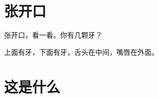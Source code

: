\documentclass[12pt,UTF-8,openany]{ctexbook}
\begin{document}
\hanzibox{}\hanzibox{}\hanzibox{}\hanzibox{}\hspace{1em}\hanzibox{}\hanzibox{}\hanzibox{}\hanzibox{}

\hanzibox{}\hanzibox{}\hanzibox{}\hanzibox{}\hspace{1em}\hanzibox{}\hanzibox{}\hanzibox{}\hanzibox{}

\hanzibox{}\hanzibox{}\hanzibox{}\hanzibox{}\hspace{1em}\hanzibox{}\hanzibox{}\hanzibox{}\hanzibox{}

\hanzibox{}\hanzibox{}\hanzibox{}\hanzibox{}\hspace{1em}\hanzibox{}\hanzibox{}\hanzibox{}\hanzibox{}

\hanzibox{}\hanzibox{}\hanzibox{}\hanzibox{}\hspace{1em}




\chapter{张开口}

\begin{large}
    
    张开口，看一看。你有几颗牙？
    
    上面有牙，下面有牙，舌头在中间，嘴唇在外面。
    
\end{large}


\clearpage

\begin{center}
    
\end{center}


\hanzibox{}\hanzibox{}\hanzibox{}\hanzibox{}\hspace{1em}\hanzibox{}\hanzibox{}\hanzibox{}\hanzibox{}

\hanzibox{}\hanzibox{}\hanzibox{}\hanzibox{}\hspace{1em}\hanzibox{}\hanzibox{}\hanzibox{}\hanzibox{}

\hanzibox{}\hanzibox{}\hanzibox{}\hanzibox{}\hspace{1em}




\chapter{这是什么}
\end{document}
